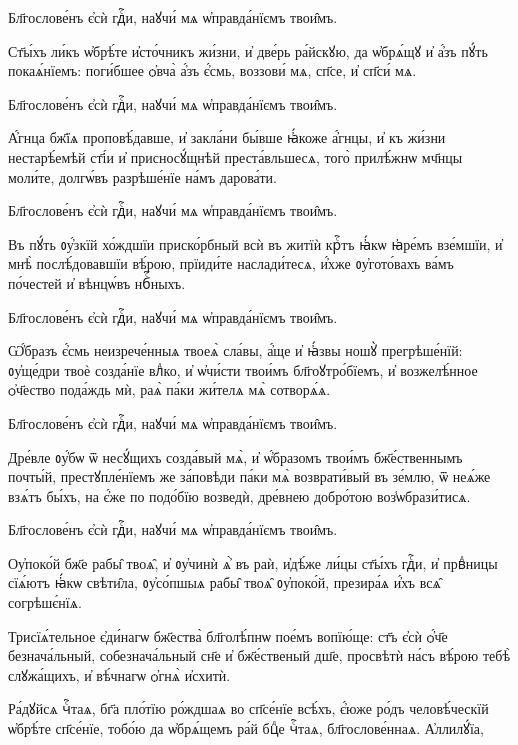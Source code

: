 \label{neporochsat}


\hKv Бл҃гослове́нъ є҆сѝ гдⷭ҇и, наꙋчи́ мѧ ѡ҆правда́нїємъ  твои̑мъ. 

\hKv Ст҃ы́хъ ли́къ ѡ҆брѣ́те и҆сто́чникъ жи́зни, и҆ две́рь  ра́йскꙋю, да ѡ҆брѧ́щꙋ и҆ а҆́зъ пꙋ́ть покаѧ́нїемъ: поги́бшее  ѻ҆вча̀ а҆́зъ є҆́смь, воззови́ мѧ, сп҃се, и҆ сп҃си́ мѧ. 

\hKv Бл҃гослове́нъ є҆сѝ гдⷭ҇и, наꙋчи́ мѧ ѡ҆правда́нїємъ  твои̑мъ. 

\hKv А҆́гнца бж҃їѧ проповѣ́давше, и҆ закла́ни бы́вше ꙗ҆́коже  а҆́гнцы, и҆ къ жи́зни нестарѣ́емѣй ст҃і́и и҆  присносꙋ́щнѣй преста́вльшесѧ, того̀ прилѣ́жнѡ мч҃нцы  моли́те, долгѡ́въ разрѣше́нїе на́мъ дарова́ти.  

\hKv Бл҃гослове́нъ є҆сѝ гдⷭ҇и, наꙋчи́ мѧ ѡ҆правда́нїємъ  твои̑мъ. 

\hKv Въ пꙋ́ть ᲂу҆́зкїй хо́ждшїи приско́рбный всѝ въ житїѝ  крⷭ҇тъ ꙗ҆́кѡ ꙗ҆ре́мъ взе́мшїи, и҆ мнѣ̀ послѣ́довавшїи  вѣ́рою, прїиди́те наслади́тесѧ, и҆́хже ᲂу҆гото́вахъ ва́мъ  по́честей и҆ вѣнцѡ́въ нбⷭ҇ныхъ. 

\hKv Бл҃гослове́нъ є҆сѝ гдⷭ҇и, наꙋчи́ мѧ ѡ҆правда́нїємъ  твои̑мъ. 

\hKv Ѡ҆́бразъ є҆́смь неизрече́нныѧ твоеѧ̀ сла́вы, а҆́ще и҆  ꙗ҆́звы ношꙋ̀ прегрѣше́нїй: ᲂу҆ще́дри твоѐ созда́нїе  влⷣко, и҆ ѡ҆чи́сти твои́мъ бл҃гоꙋтро́бїемъ, и҆  возжелѣ́нное ѻ҆ч҃ество пода́ждь мѝ, раѧ̀ па́ки жи́телѧ  мѧ̀ сотворѧ́ѧ. 

\hKv Бл҃гослове́нъ є҆сѝ гдⷭ҇и, наꙋчи́ мѧ ѡ҆правда́нїємъ  твои̑мъ. 

\hKv Дре́вле ᲂу҆́бѡ ѿ несꙋ́щихъ созда́вый мѧ̀, и҆ ѡ҆́бразомъ  твои́мъ бж҃е́ственнымъ почты́й, престꙋпле́нїемъ же  за́повѣди па́ки мѧ̀ возврати́вый въ зе́млю, ѿ неѧ́же  взѧ́тъ бы́хъ,  на є҆́же по  подо́бїю возведѝ, дре́внею добро́тою воз̾ѡбрази́тисѧ. 

\hKv Бл҃гослове́нъ є҆сѝ гдⷭ҇и, наꙋчи́ мѧ ѡ҆правда́нїємъ  твои̑мъ. 

\hKv Оу҆поко́й бж҃е рабы̑ твоѧ̑, и҆ ᲂу҆чинѝ ѧ҆̀ въ раѝ,  и҆дѣ́же ли́цы ст҃ы́хъ гдⷭ҇и, и҆ првⷣницы сїѧ́ютъ ꙗ҆́кѡ  свѣти̑ла, ᲂу҆со́пшыѧ рабы̑ твоѧ̑ ᲂу҆поко́й, презира́ѧ  и҆́хъ всѧ̑ согрѣшє́нїѧ. 
%

\hKv Трисїѧ́тельное є҆ди́нагѡ бж҃ества̀ бл҃голѣ́пнѡ  пое́мъ вопїю́ще: ст҃ъ є҆сѝ ѻ҆́ч҃е безнача́льный,  собезнача́льный сн҃е и҆ бж҃е́ственый дш҃е, просвѣтѝ на́съ  вѣ́рою тебѣ̀ слꙋжа́щихъ, и҆ вѣ́чнагѡ ѻ҆гнѧ̀ и҆схитѝ. 
%

\hKv Ра́дꙋйсѧ чⷭ҇таѧ, бг҃а пло́тїю ро́ждшаѧ во  сп҃се́нїе всѣ́хъ, є҆́юже ро́дъ человѣ́ческїй ѡ҆брѣ́те  сп҃се́нїе, тобо́ю да ѡ҆брѧ́щемъ ра́й бцⷣе чⷭ҇таѧ,  бл҃гослове́ннаѧ. 
%
\hKv А҆ллилꙋ́їа, 

